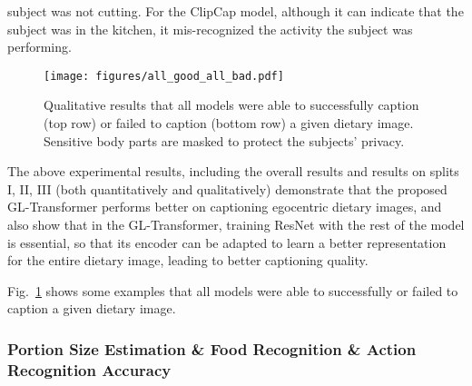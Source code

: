 \documentclass[journal]{IEEEtran}
\begin{document}
subject was not cutting. For the ClipCap model, although it can indicate that the subject was in the kitchen, it mis-recognized the activity the subject was performing.




\begin{figure}[!t]
\centerline{\texttt{[image: figures/all\_good\_all\_bad.pdf]}}
\caption{Qualitative results that all models were able to successfully caption (top row) or failed to caption (bottom row) a given dietary image. Sensitive body parts are masked to protect the subjects' privacy.}
\label{fig:all_good_all_bad}

\end{figure}





The above experimental results, including the overall results and results on splits I, II, III (both quantitatively and qualitatively) demonstrate that the proposed GL-Transformer performs better on captioning egocentric dietary images, and also show that in the GL-Transformer, training ResNet with the rest of the model is essential, so that its encoder can be adapted to learn a better representation for the entire dietary image, leading to better captioning quality.

Fig.~\ref{fig:all_good_all_bad} shows some examples that all models were able to successfully or failed to caption a given dietary image.




























\subsubsection{Portion Size Estimation \& Food Recognition \& Action Recognition Accuracy}\label{subsubsec:volume_food_action}
\end{document}
